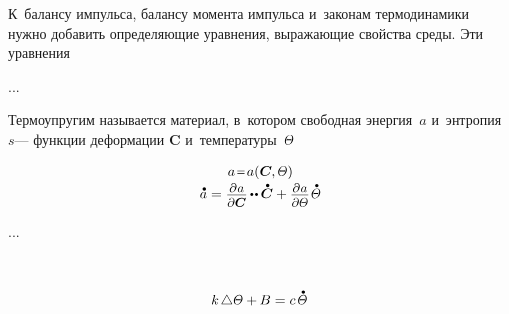 \label{section:constitutiveequations.thermoelasticity}

\begin{otherlanguage}{russian}

К~балансу импульса, балансу момента импульса и~законам термодинамики нужно добавить определяющие уравнения, выражающие свойства среды. Эти уравнения

...

Термоупругим называется материал, в~котором свободная энергия~$a$ и~энтропия~$s$\:--- функции деформации $\bm{C}$ и~температуры~$\temperaturefield$

\nopagebreak\vspace{-0.1em}\begin{equation*}\begin{array}{c}
a \narroweq a(\bm{C} \hspace{-0.1ex} , \temperaturefield)
\\[.2em]
%
\mathdotabove{a}
= \scalebox{0.92}[0.92]{$ \displaystyle \frac{\raisemath{-0.2em}{\partial\hspace{.1ex} a}}{\partial \bm{C}}$}
\hspace{-0.15ex} \dotdotp \hspace{-0.1ex} \mathdotabove{\bm{C}}
+ \scalebox{0.92}[0.92]{$ \displaystyle \frac{\raisemath{-0.2em}{\partial\hspace{.1ex} a}}{\partial \temperaturefield}$}
\hspace{.2ex} \mathdotabove{\temperaturefield}
\end{array}\end{equation*}

...

\end{otherlanguage}



\label{section:heatequation}

~\en{,}

\nopagebreak\en{\vspace{-0.15em}}\ru{\vspace{-0.88em}}\begin{equation}\label{heatequation:mathematicalphysics}
k \hspace{-0.1ex} \Laplacian \temperaturefield + \hspace{-0.1ex} B = c \hspace{.33ex} \mathdotabove{\temperaturefield}
\end{equation}

